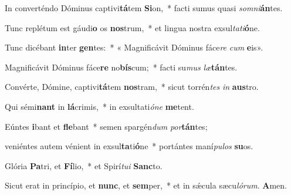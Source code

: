 \item In converténdo Dóminus captivi\textbf{tá}tem \textbf{Si}on,~* facti sumus quasi \textit{som}\textit{ni}\textbf{án}tes.

\item Tunc replétum est gáudi\textbf{o} os \textbf{nos}trum,~* et lingua nostra exsul\textit{ta}\textit{ti}\textbf{ó}ne.

\item Tunc dicébant \textbf{in}ter \textbf{gen}tes:~* « Magnificávit Dóminus fáce\textit{re} \textit{cum} \textbf{e}is».

\item Magnificávit Dóminus fáce\textbf{re} no\textbf{bís}cum;~* facti su\textit{mus} \textit{læ}\textbf{tán}tes.

\item Convérte, Dómine, captivi\textbf{tá}tem \textbf{nos}tram,~* sicut torrén\textit{tes} \textit{in} \textbf{aus}tro.

\item Qui sémi\textbf{nant} in \textbf{lá}crimis,~* in exsultati\textit{ó}\textit{ne} \textbf{me}tent.

\item Eúntes \textbf{i}bant et \textbf{fle}bant~* semen spargén\textit{dum} \textit{por}\textbf{tán}tes;

\item veniéntes autem vénient in exsul\textbf{ta}ti\textbf{ó}ne~* portántes maní\textit{pu}\textit{los} \textbf{su}os.

\item Glória \textbf{Pa}tri, et \textbf{Fí}lio,~* et Spirí\textit{tu}\textit{i} \textbf{Sanc}to.

\item Sicut erat in princípio, et \textbf{nunc}, et \textbf{sem}per,~* et in sǽcula sæcu\textit{ló}\textit{rum}. \textbf{A}men.